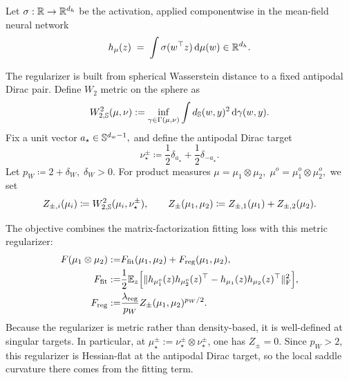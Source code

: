 Let \(\sigma:\mathbb{R}\to\mathbb{R}^{d_h}\) be the activation, applied componentwise in the mean-field neural network
\begin{equation}
    h_\mu(z)
    \;=\; \int \sigma(w^\top z)\,\dd \mu(w) \in \mathbb{R}^{d_h}.
\end{equation}

The regularizer is built from spherical Wasserstein distance to a fixed antipodal Dirac pair.
Define $W_2$ metric on the sphere as
\[
W_{2,\mathbb{S}}^2(\mu,\nu)
:=
\inf_{\gamma\in\Gamma(\mu,\nu)}
\int d_{\mathbb{S}}(w,y)^2\,\dd\gamma(w,y).
\]
Fix a unit vector $a_\star\in\mathbb{S}^{d_w-1}, $
and define the antipodal Dirac target
\[
    \nu_\star^\pm
    \coloneq
    \frac12\delta_{a_\star}+\frac12\delta_{-a_\star}.
\]
Let $p_W\coloneq 2+\delta_W,
    \;
    \delta_W>0.$
For product measures $\mu=\mu_1\otimes\mu_2,\;
    \mu^o=\mu_1^o\otimes\mu_2^o,$
we set
\[
    Z_{\pm,i}(\mu_i)
    \coloneq
    W_{2,\mathbb{S}}^2(\mu_i,\nu_\star^\pm),
    \qquad
    Z_\pm(\mu_1,
    \mu_2)
    \coloneq
    Z_{\pm,1}(\mu_1)+Z_{\pm,2}(\mu_2).
\]

The objective combines the matrix-factorization fitting loss with this metric regularizer:
\begin{align}
\label{eq:EMN-objective-squared-chi2}
F(\mu_1\otimes\mu_2)
:=&
F_{\mathrm{fit}}(\mu_1,\mu_2)
+
F_{\mathrm{reg}}(\mu_1,\mu_2),\\
F_{\mathrm{fit}}
:=&
\frac12\mathbb{E}_z\Bigl[
\|h_{\mu_1^o}(z)h_{\mu_2^o}(z)^\top
-h_{\mu_1}(z)h_{\mu_2}(z)^\top\|_{\mathrm F}^2
\Bigr],\\
F_{\mathrm{reg}}
:=&
\frac{\lambda_{\mathrm{reg}}}{p_W}Z_\pm(\mu_1,\mu_2)^{p_W/2}.
\end{align}
Because the regularizer is metric rather than density-based, it is well-defined at singular targets. In particular, at
\(\mu_\star^\pm:=\nu_\star^\pm\otimes\nu_\star^\pm\), one has \(Z_\pm=0\). Since \(p_W>2\), this regularizer is Hessian-flat at the antipodal Dirac target, so the local saddle curvature there comes from the fitting term.

